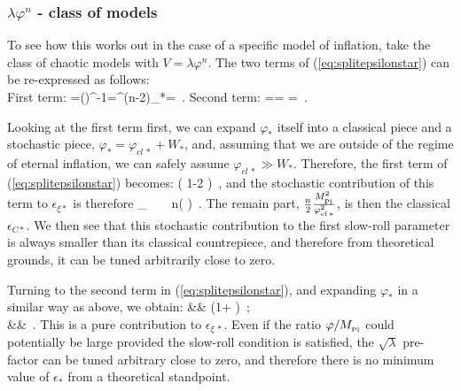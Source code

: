 \documentclass[useAMS,usenatbib,a4paper,onecolumn]{mn2e}
\begin{document}
\subsubsection{$\lambda\varphi^n$ - class of models}
To see how this works out in the case of a specific model of inflation, take the class of chaotic models with $V=\lambda\varphi^n$. The two terms of (\ref{eq:splitepsilonstar}) can be re-expressed as follows:
\\
First term:
\be
	=\left(\right)^{-1}=\varphi^{(n-2)}_*=\, .
\ee
Second term:
\be
	\tilde{\xi}=\tilde\xi= \tilde\xi=\, .
\ee

Looking at the first term first, we can expand $\varphi_*$ itself into a classical piece and a stochastic piece, $\varphi_*=\varphi_{cl\,*}+W_*$, and, assuming that we are outside of the regime of eternal inflation, we can safely assume $\varphi_{cl\,*}\gg W_*$. Therefore, the first term of (\ref{eq:splitepsilonstar}) becomes:
\be
	\approx {}\left( 1-2 \right)\, ,
\ee
and the stochastic contribution of this term to $\epsilon_{\xi*}$ is therefore
\be
	\epsilon_{\xi*}  ~ \supset~ n\left(  \right)\, .
\ee
The remain part, $ \frac{n}{2}\frac{M_{_\mathrm{Pl}}^2}{\varphi_{cl\,*}^2}$, is then the classical $\epsilon_{C*}$. We then see that this stochastic contribution to the first slow-roll parameter is always smaller than its classical countrepiece, and therefore from theoretical grounds, it can be tuned arbitrarily close to zero.

Turning to the second term in (\ref{eq:splitepsilonstar}), and expanding $\varphi_*$ in a similar way as above, we obtain:
\bea
	\tilde{\xi}&\approx&  \left(1+ \right)\tilde\xi \, ;\\
	&\approx&\tilde\xi \, .
\eea
This is a pure contribution to $\epsilon_{\xi\, *}$. Even if the ratio $\varphi/M_{_\mathrm{Pl}}$ could potentially be large provided the slow-roll condition is satisfied, the $\sqrt{\lambda}$ pre-factor can be tuned arbitrary close to zero, and therefore there is no minimum value of $\epsilon_*$ from a theoretical standpoint.
\end{document}
